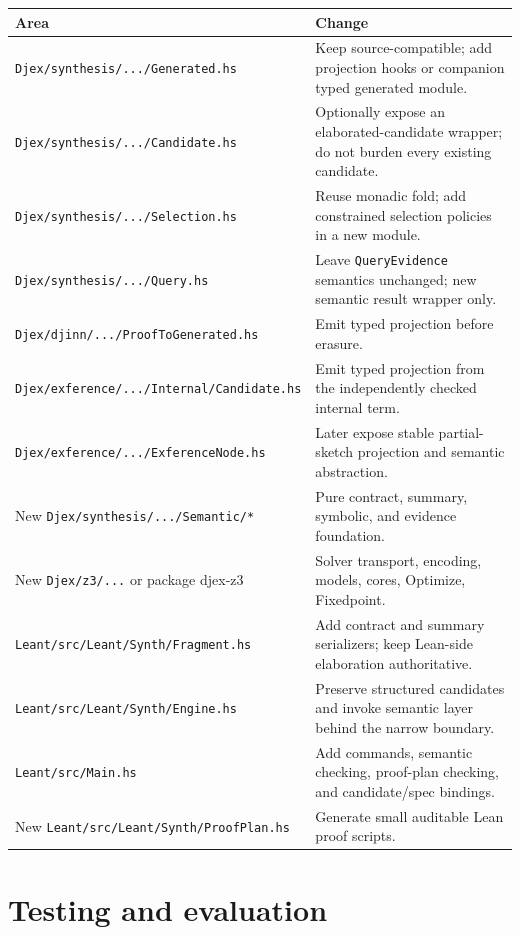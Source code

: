 \documentclass[11pt,oneside]{article}
\newcommand{\repo}[1]{\textsf{#1}}
\newcommand{\code}[1]{\texttt{#1}}
\newcommand{\filepath}[1]{\nolinkurl{#1}}
\begin{document}
\begin{longtable}{@{}p{}p{}@{}}
\toprule
\textbf{Area} & \textbf{Change} \\
\midrule
\endhead
\filepath{Djex/synthesis/.../Generated.hs} & Keep source-compatible; add projection
hooks or companion typed generated module. \\
\filepath{Djex/synthesis/.../Candidate.hs} & Optionally expose an elaborated-candidate
wrapper; do not burden every existing candidate. \\
\filepath{Djex/synthesis/.../Selection.hs} & Reuse monadic fold; add constrained
selection policies in a new module. \\
\filepath{Djex/synthesis/.../Query.hs} & Leave \code{QueryEvidence} semantics unchanged;
new semantic result wrapper only. \\
\filepath{Djex/djinn/.../ProofToGenerated.hs} & Emit typed projection before erasure. \\
\filepath{Djex/exference/.../Internal/Candidate.hs} & Emit typed projection from the
independently checked internal term. \\
\filepath{Djex/exference/.../ExferenceNode.hs} & Later expose stable partial-sketch
projection and semantic abstraction. \\
New \filepath{Djex/synthesis/.../Semantic/*} & Pure contract, summary, symbolic, and
evidence foundation. \\
New \filepath{Djex/z3/...} or package \repo{djex-z3} & Solver transport, encoding, models,
cores, Optimize, Fixedpoint. \\
\filepath{Leant/src/Leant/Synth/Fragment.hs} & Add contract and summary serializers;
keep Lean-side elaboration authoritative. \\
\filepath{Leant/src/Leant/Synth/Engine.hs} & Preserve structured candidates and invoke
semantic layer behind the narrow boundary. \\
\filepath{Leant/src/Main.hs} & Add commands, semantic checking, proof-plan checking,
and candidate/spec bindings. \\
New \filepath{Leant/src/Leant/Synth/ProofPlan.hs} & Generate small auditable Lean proof
scripts. \\
\bottomrule
\end{longtable}

\section{Testing and evaluation}
\end{document}
